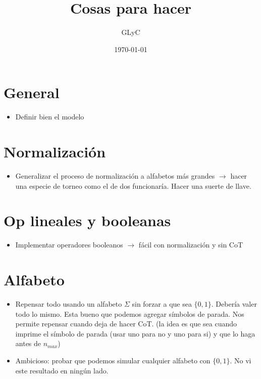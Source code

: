 \documentclass{article}
\title{Cosas para hacer}
\author{GLyC}
\date{\today}
\begin{document}
\maketitle


\section{General}

\begin{itemize}
    \item Definir bien el modelo
\end{itemize}




\section{Normalización}

\begin{itemize}
    \item Generalizar el proceso de normalización a alfabetos más grandes $\rightarrow$ hacer una especie de torneo como el de dos funcionaría. Hacer una suerte de llave.
\end{itemize}




\section{Op lineales y booleanas}

\begin{itemize}
    \item Implementar operadores booleanos $\rightarrow$ fácil con normalización y sin CoT
\end{itemize}


\section{Alfabeto}

\begin{itemize}
    \item Repensar todo usando un alfabeto $\Sigma$ sin forzar a que sea $\{0,1\}$. Debería valer todo lo mismo. Esta bueno que podemos agregar símbolos de parada. Nos permite repensar cuando deja de hacer CoT. (la idea es que sea cuando imprime el símbolo de parada (usar uno para no y uno para si) y que lo haga antes de $n_{max}$)
    \item Ambicioso: probar que podemos simular cualquier alfabeto con $\{0,1\}$. No vi este resultado en ningún lado.
\end{itemize}
\end{document}

